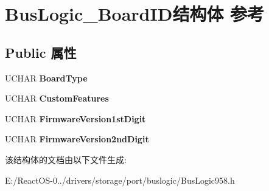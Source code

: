 \hypertarget{struct_bus_logic___board_i_d}{}\section{Bus\+Logic\+\_\+\+Board\+I\+D结构体 参考}
\label{struct_bus_logic___board_i_d}
\subsection*{Public 属性}
\begin{DoxyCompactItemize}
\item 
\mbox{\label{struct_bus_logic___board_i_d_abb2169007bd817f34e2c862c27013458}} 
U\+C\+H\+AR {\bfseries Board\+Type}
\item 
\mbox{\label{struct_bus_logic___board_i_d_a8b80f65204319463fde7e0655cb108c7}} 
U\+C\+H\+AR {\bfseries Custom\+Features}
\item 
\mbox{\label{struct_bus_logic___board_i_d_a7805c406b2bfb3462b479b1e0a43e38a}} 
U\+C\+H\+AR {\bfseries Firmware\+Version1st\+Digit}
\item 
\mbox{\label{struct_bus_logic___board_i_d_a86617fc739bb8c6f1bbf7ed699e22c9d}} 
U\+C\+H\+AR {\bfseries Firmware\+Version2nd\+Digit}
\end{DoxyCompactItemize}


该结构体的文档由以下文件生成\+:\begin{DoxyCompactItemize}
\item 
E\+:/\+React\+O\+S-\/0../drivers/storage/port/buslogic/Bus\+Logic958.\+h\end{DoxyCompactItemize}
